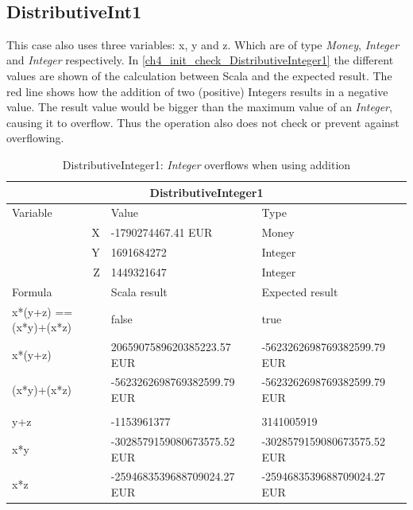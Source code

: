 \\

\subsection{DistributiveInt1}
This case also uses three variables: x, y and z. Which are of type \textit{Money}, \textit{Integer} and \textit{Integer} respectively. In \autoref{ch4_init_check_DistributiveInteger1} the different values are shown of the calculation between Scala and the expected result. The red line shows how the addition of two (positive) Integers results in a negative value. The result value would be bigger than the maximum value of an \textit{Integer}, causing it to overflow. Thus the operation also does not check or prevent against overflowing. 
\\
\begin{table}[h!]
\centering
\begin{tabular}{|lll|}
\hline
\multicolumn{3}{|c|}{DistributiveInteger1}                                             \\ \hline
Variable               & Value                       & Type                        \\
\multicolumn{1}{|r}{X} & -1790274467.41 EUR          & Money                       \\
\multicolumn{1}{|r}{Y} & 1691684272                  & Integer                     \\
\multicolumn{1}{|r}{Z} & 1449321647                  & Integer                     \\ \hline
Formula                & Scala result                & Expected result             \\
x*(y+z) == (x*y)+(x*z) & false                       & true                        \\
x*(y+z)                & 2065907589620385223.57 EUR  & -5623262698769382599.79 EUR \\
(x*y)+(x*z)            & -5623262698769382599.79 EUR & -5623262698769382599.79 EUR \\
                       &                             &                             \\
y+z                    & -1153961377                 & 3141005919                  \\
x*y                    & -3028579159080673575.52 EUR & -3028579159080673575.52 EUR \\
x*z                    & -2594683539688709024.27 EUR & -2594683539688709024.27 EUR \\ \hline
\end{tabular}
\caption{DistributiveInteger1: \textit{Integer} overflows when using addition}
\label{ch4_init_check_DistributiveInt1}
\end{table}
\\

